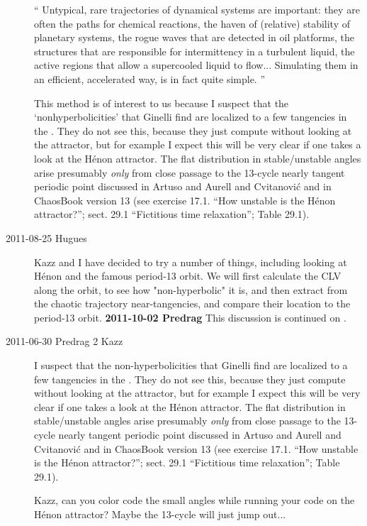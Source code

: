 \begin{description}
``
Untypical, rare trajectories of dynamical systems are important: they are
often the paths for chemical reactions, the haven of (relative) stability
of planetary systems, the rogue waves that are detected in oil platforms,
the structures that are responsible for intermittency in a turbulent
liquid, the active regions that allow a supercooled liquid to flow...
Simulating them in an efficient, accelerated way, is in fact quite
simple.
''

This method is of interest to us because I suspect that the
`nonhyperbolicities' that Ginelli\etal{} find are
localized to a few tangencies in the \statesp. They do not see this,
because they just compute without looking at the attractor, but for
example I expect this will be very clear if one takes a look at the
H\'enon attractor. The flat distribution in stable/unstable angles arise
presumably {\em only} from close passage to the 13-cycle nearly tangent
periodic point discussed in Artuso and Aurell and
Cvitanovi{\'{c}} and in ChaosBook version 13 (see exercise
17.1. ``How unstable is the H\'enon attractor?''; sect. 29.1 ``Fictitious
time relaxation''; Table 29.1).

\item[2011-08-25 Hugues]
Kazz and I have decided to try a number of things, including looking at
H\'enon and the famous period-13 orbit. We will first calculate the CLV
along the orbit, to see how "non-hyperbolic" it is, and then extract from
the chaotic trajectory near-tangencies, and compare their location to the
period-13 orbit. {\bf 2011-10-02 Predrag} This discussion is continued on
.

\item[2011-06-30 Predrag 2 Kazz]
I suspect that the  non-hyperbolicities that
Ginelli\etal{} find are localized to a few tangencies in
the \statesp. They do not see this, because they just compute without
looking at the attractor, but for example I expect this will be very
clear if one takes a look at the H\'enon attractor. The flat distribution
in stable/unstable angles arise presumably {\em only} from close passage
to the 13-cycle nearly tangent periodic point discussed in Artuso and
Aurell and Cvitanovi{\'{c}} and in ChaosBook version 13 (see
exercise 17.1. ``How unstable is the H\'enon attractor?''; sect. 29.1
``Fictitious time relaxation''; Table 29.1).

Kazz, can you color code the small angles while running your code on the
H\'enon attractor? Maybe the 13-cycle will just jump out...


\end{description}
